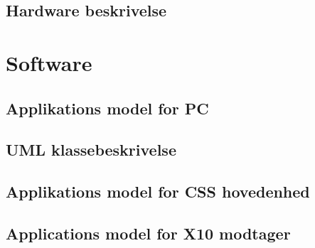 \subsection{Hardware beskrivelse}


\newpage
\section{Software}

\subsection{Applikations model for PC}

\clearpage

\subsection{UML klassebeskrivelse}

\newpage

\subsection{Applikations model for CSS hovedenhed}


\newpage
\subsection{Applications model for X10 modtager}

